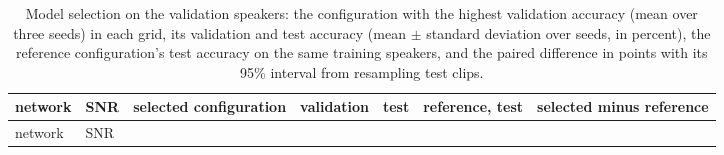 \documentclass{article}
\begin{document}
\begin{longtable}[]{@{}
  >{\raggedright\arraybackslash}p{}
  >{\raggedright\arraybackslash}p{}
  >{\raggedright\arraybackslash}p{}
  >{\raggedright\arraybackslash}p{}
  >{\raggedright\arraybackslash}p{}
  >{\raggedright\arraybackslash}p{}
  >{\raggedright\arraybackslash}p{}@{}}
\caption{Model selection on the validation speakers: the configuration
with the highest validation accuracy (mean over three seeds) in each
grid, its validation and test accuracy (mean \ensuremath{\pm} standard
deviation over seeds, in percent), the reference configuration's test
accuracy on the same training speakers, and the paired difference in
points with its 95\% interval from resampling test
clips.}\tabularnewline
\toprule\noalign{}
\begin{minipage}[b]{\linewidth}\raggedright
network
\end{minipage} & \begin{minipage}[b]{\linewidth}\raggedright
SNR
\end{minipage} & \begin{minipage}[b]{\linewidth}\raggedright
selected configuration
\end{minipage} & \begin{minipage}[b]{\linewidth}\raggedright
validation
\end{minipage} & \begin{minipage}[b]{\linewidth}\raggedright
test
\end{minipage} & \begin{minipage}[b]{\linewidth}\raggedright
reference, test
\end{minipage} & \begin{minipage}[b]{\linewidth}\raggedright
selected minus reference
\end{minipage} \\
\midrule\noalign{}
\endfirsthead
\toprule\noalign{}
\begin{minipage}[b]{\linewidth}\raggedright
network
\end{minipage} & \begin{minipage}[b]{\linewidth}\raggedright
SNR
\end{minipage} & \begin{minipage}[b]{\linewidth}\raggedright

\end{minipage}
\end{longtable}
\end{document}
